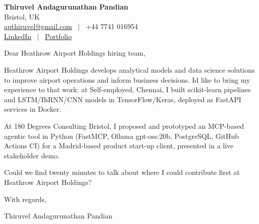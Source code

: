 \documentclass[11pt,a4paper]{article}
\begin{document}
\raggedright
\pagestyle{empty}

\begin{center}
    {\LARGE \color{linkblue} \textbf{Thiruvel Andagurunathan Pandian}}\\[0.2cm]
    Bristol, UK \\
    \href{mailto:apthiruvel@gmail.com}{apthiruvel@gmail.com} \ $|$ \ +44 7741 016954 \\
\href{https://www.linkedin.com/in/thiruvel-a-p/}{LinkedIn} \ $|$ \ \href{https://thiruvel-ap.github.io/PersonalPortfolio/}{Portfolio}
\end{center}

\vspace{0.4cm}

\noindent
Dear Heathrow Airport Holdings hiring team,

Heathrow Airport Holdings develops analytical models and data science solutions to improve airport operations and inform business decisions. I\textquotesingle{}d like to bring my experience to that work: at Self-employed, Chennai, I built scikit-learn pipelines and LSTM/BiRNN/CNN models in TensorFlow/Keras, deployed as FastAPI services in Docker.

At 180 Degrees Consulting Bristol, I proposed and prototyped an MCP-based agentic tool in Python (FastMCP, Ollama gpt-oss:20b, PostgreSQL, GitHub Actions CI) for a Madrid-based product start-up client, presented in a live stakeholder demo.

Could we find twenty minutes to talk about where I could contribute first at Heathrow Airport Holdings?

\vspace{0.5cm}

With regards,

Thiruvel Andagurunathan Pandian
\end{document}
